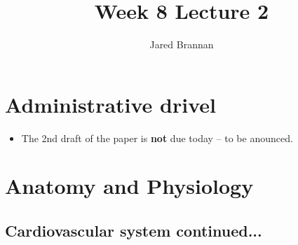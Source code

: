 \documentclass{article}
\title{Week 8 Lecture 2}
\author{Jared Brannan }
\theoremstyle{definition}
\begin{document}
\maketitle

\section{Administrative drivel}
\begin{itemize}
	\item The 2nd draft of the paper is \textbf{not} due today -- to be anounced.
\end{itemize}

\section{Anatomy and Physiology}

\subsection{Cardiovascular system continued...}
\end{document}
